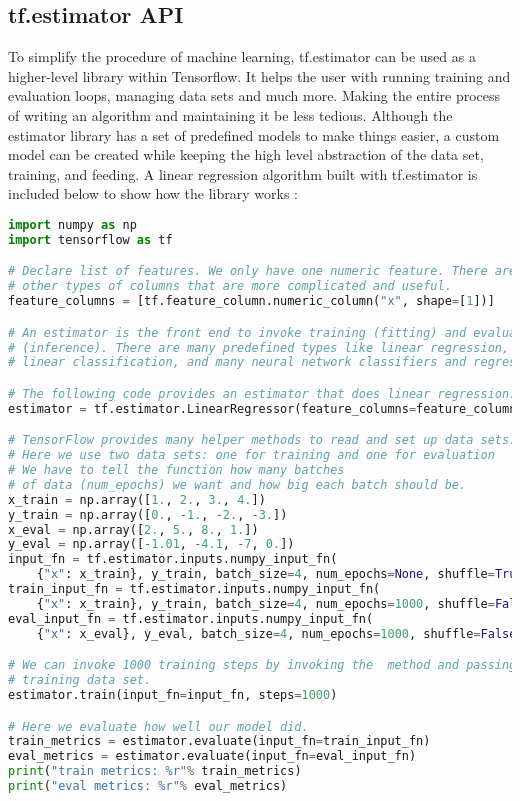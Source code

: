 \subsection{tf.estimator API}
To simplify the procedure of machine learning,
tf.estimator can be used as a higher-level library within Tensorflow.
It helps the user with running training and evaluation loops, managing data sets and much more. 
Making the entire process of writing an algorithm and maintaining it be less tedious.
Although the estimator library has a set of predefined models to make things easier, a custom model can be created while keeping the high
level abstraction of the data set, training, and feeding.
A linear regression algorithm built with tf.estimator is included below to show how the library works \cite{Estimator}:
\begin{lstlisting}[language=Python, caption=Linear regression algorithm built with tf.estimator.]
import numpy as np
import tensorflow as tf

# Declare list of features. We only have one numeric feature. There are many
# other types of columns that are more complicated and useful.
feature_columns = [tf.feature_column.numeric_column("x", shape=[1])]

# An estimator is the front end to invoke training (fitting) and evaluation
# (inference). There are many predefined types like linear regression,
# linear classification, and many neural network classifiers and regressors.

# The following code provides an estimator that does linear regression.
estimator = tf.estimator.LinearRegressor(feature_columns=feature_columns)

# TensorFlow provides many helper methods to read and set up data sets.
# Here we use two data sets: one for training and one for evaluation
# We have to tell the function how many batches
# of data (num_epochs) we want and how big each batch should be.
x_train = np.array([1., 2., 3., 4.])
y_train = np.array([0., -1., -2., -3.])
x_eval = np.array([2., 5., 8., 1.])
y_eval = np.array([-1.01, -4.1, -7, 0.])
input_fn = tf.estimator.inputs.numpy_input_fn(
    {"x": x_train}, y_train, batch_size=4, num_epochs=None, shuffle=True)
train_input_fn = tf.estimator.inputs.numpy_input_fn(
    {"x": x_train}, y_train, batch_size=4, num_epochs=1000, shuffle=False)
eval_input_fn = tf.estimator.inputs.numpy_input_fn(
    {"x": x_eval}, y_eval, batch_size=4, num_epochs=1000, shuffle=False)

# We can invoke 1000 training steps by invoking the  method and passing the
# training data set.
estimator.train(input_fn=input_fn, steps=1000)

# Here we evaluate how well our model did.
train_metrics = estimator.evaluate(input_fn=train_input_fn)
eval_metrics = estimator.evaluate(input_fn=eval_input_fn)
print("train metrics: %r"% train_metrics)
print("eval metrics: %r"% eval_metrics)
\end{lstlisting}

